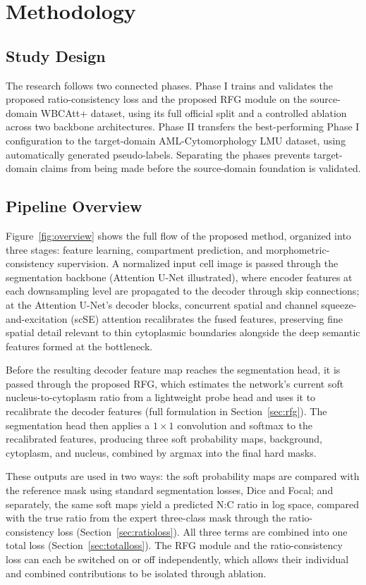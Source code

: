 \documentclass[pdflatex,sn-mathphys-num]{sn-jnl}%
\theoremstyle{thmstyleone}%
\theoremstyle{thmstyletwo}%
\theoremstyle{thmstylethree}%
\begin{document}
\section{Methodology}\label{sec:3}

\subsection{Study Design}

The research follows two connected phases. Phase I trains and validates the proposed ratio-consistency loss and the proposed RFG module on the source-domain WBCAtt+ dataset, using its full official split and a controlled ablation across two backbone architectures. Phase II transfers the best-performing Phase I configuration to the target-domain AML-Cytomorphology LMU dataset, using automatically generated pseudo-labels. Separating the phases prevents target-domain claims from being made before the source-domain foundation is validated.

\subsection{Pipeline Overview}
\label{sec:pipeline}
 
Figure~\ref{fig:overview} shows the full flow of the proposed method, organized into three stages: feature learning, compartment prediction, and morphometric-consistency supervision. A normalized input cell image is passed through the segmentation backbone (Attention U-Net illustrated), where encoder features at each downsampling level are propagated to the decoder through skip connections; at the Attention U-Net's decoder blocks, concurrent spatial and channel squeeze-and-excitation (scSE) attention recalibrates the fused features, preserving fine spatial detail relevant to thin cytoplasmic boundaries alongside the deep semantic features formed at the bottleneck.
 
Before the resulting decoder feature map reaches the segmentation head, it is passed through the proposed RFG, which estimates the network's current soft nucleus-to-cytoplasm ratio from a lightweight probe head and uses it to recalibrate the decoder features (full formulation in Section~\ref{sec:rfg}). The segmentation head then applies a $1\times1$ convolution and softmax to the recalibrated features, producing three soft probability maps, background, cytoplasm, and nucleus, combined by argmax into the final hard masks.
 
These outputs are used in two ways: the soft probability maps are compared with the reference mask using standard segmentation losses, Dice and Focal; and separately, the same soft maps yield a predicted N:C ratio in log space, compared with the true ratio from the expert three-class mask through the ratio-consistency loss (Section~\ref{sec:ratioloss}). All three terms are combined into one total loss (Section~\ref{sec:totalloss}). The RFG module and the ratio-consistency loss can each be switched on or off independently, which allows their individual and combined contributions to be isolated through ablation.
 
\end{document}
